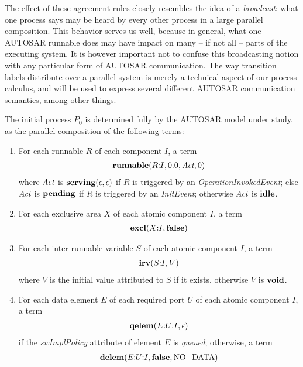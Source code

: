 \documentclass[twocolumn]{article}
\newcommand{\V}[1]{\mbox{\it #1}}
\newcommand{\Act}{\V{Act}}
\newcommand{\void}{\mbox{\bf void}}
\newcommand{\false}{\mbox{\bf false}}
\newcommand{\idle}{\mbox{\bf idle}}
\newcommand{\pending}{\mbox{\bf pending}}
\newcommand{\serving}[2]{\mbox{\bf serving}(#1,#2)}
\newcommand{\seq}[2]{#1\hspace{-0.7ex}:\hspace{-0.7ex}#2}
\newcommand{\seqq}[3]{#1\hspace{-0.7ex}:\hspace{-0.7ex}#2\hspace{-0.7ex}:\hspace{-0.7ex}#3}
\newcommand{\runnable}[4]{\mbox{\bf runnable}(#1,#2,#3,#4)}
\newcommand{\excl}[2]{\mbox{\bf excl}(#1,#2)}
\newcommand{\irv}[2]{\mbox{\bf irv}(#1,#2)}
\newcommand{\qelem}[2]{\mbox{\bf qelem}(#1,#2)}
\newcommand{\delem}[3]{\mbox{\bf delem}(#1,#2,#3)}
\begin{document}
The effect of these agreement rules closely resembles the idea of a {\em broadcast}: what one process says may be heard by every other process in a large parallel composition. This behavior serves us well, because in general, what one AUTOSAR runnable does may have impact on many -- if not all -- parts of the executing system. It is however important not to confuse this broadcasting notion with any particular form of AUTOSAR communication. The way transition labels distribute over a parallel system is merely a technical aspect of our process calculus, and will be used to express several different AUTOSAR communication semantics, among other things. 

The initial process $P_0$ is determined fully by the AUTOSAR model under study, as the parallel composition of the following terms:
\begin{enumerate}

\item For each runnable $R$ of each component $I$, a term
$$
\begin{array}{c}
	\runnable{\seq{R}{I}}{0.0}{\Act}{0}
\end{array}
$$
where $\Act$ is $\serving{\epsilon}{\epsilon}$ if $R$ is triggered by an {\em OperationInvokedEvent}; else $\Act$ is $\pending$ if $R$ is triggered by an {\em InitEvent}; otherwise $\Act$ is $\idle$.

\item For each exclusive area $X$ of each atomic component $I$, a term
$$
\begin{array}{c}
	\excl{\seq{X}{I}}{\false}
\end{array}
$$

\item For each inter-runnable variable $S$ of each atomic component $I$, a term
$$
\begin{array}{c}
	\irv{\seq{S}{I}}{V}
\end{array}
$$
where $V$ is the initial value attributed to $S$ if it exists, otherwise $V$ is $\void$.

\item For each data element $E$ of each required port $U$ of each atomic component $I$, a term
$$
\begin{array}{c}
	\qelem{\seqq{E}{U}{I}}{\epsilon}
\end{array}
$$
if the {\em swImplPolicy} attribute of element $E$ is {\em queued}; otherwise, a term
$$
\begin{array}{c}
	\delem{\seqq{E}{U}{I}}{\false}{\mbox{NO\_DATA}}
\end{array}
$$


\end{enumerate}
\end{document}
